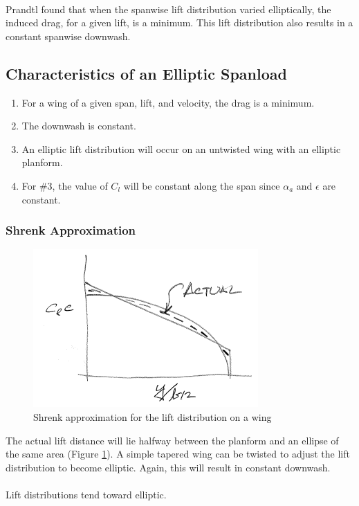 \documentclass[draft=false, titlepage]{article}
\begin{document}
\paragraph*{} Prandtl found that when the spanwise lift distribution varied elliptically, the induced drag, for a given lift, is a minimum. This lift distribution also results in a constant spanwise downwash.

\subsection{Characteristics of an Elliptic Spanload}
\begin{enumerate}
	\item For a wing of a given span, lift, and velocity, the drag is a minimum.
	\item The downwash is constant.
	\item An elliptic lift distribution will occur on an untwisted wing with an elliptic planform.
	\item For \#3, the value of $C_l$ will be constant along the span since $\alpha_a$ and $\epsilon$ are constant.
\end{enumerate}

\subsubsection{Shrenk Approximation}
\begin{figure}[ht]
	\centering
	\includegraphics[width=0.4\linewidth]{Figures/p35_shrenkApproximation.PNG}
	\caption{Shrenk approximation for the lift distribution on a wing}
	\label{fig:p35_shrenkApproximation}
\end{figure}
The actual lift distance will lie halfway between the planform and an ellipse of the same area (Figure \ref{fig:p35_shrenkApproximation}). A simple tapered wing can be twisted to adjust the lift distribution to become elliptic. Again, this will result in constant downwash.
\paragraph*{} Lift distributions tend toward elliptic.
\end{document}
